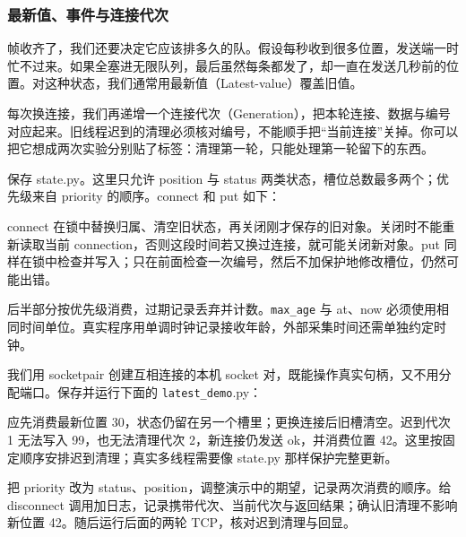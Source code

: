 \subsubsection{最新值、事件与连接代次}
帧收齐了，我们还要决定它应该排多久的队。假设每秒收到很多位置，发送端一时忙不过来。如果全塞进无限队列，最后虽然每条都发了，却一直在发送几秒前的位置。对这种状态，我们通常用最新值（Latest-value）覆盖旧值。

每次换连接，我们再递增一个连接代次（Generation），把本轮连接、数据与编号对应起来。旧线程迟到的清理必须核对编号，不能顺手把“当前连接”关掉。你可以把它想成两次实验分别贴了标签：清理第一轮，只能处理第一轮留下的东西。
\begin{example}[用完整状态类代替槽位伪代码]
保存 state.py。这里只允许 position 与 status 两类状态，槽位总数最多两个；优先级来自 priority 的顺序。connect 和 put 如下：
\begin{commcode}

\end{commcode}
connect 在锁中替换归属、清空旧状态，再关闭刚才保存的旧对象。关闭时不能重新读取当前 connection，否则这段时间若又换过连接，就可能关闭新对象。put 同样在锁中检查并写入；只在前面检查一次编号，然后不加保护地修改槽位，仍然可能出错。

后半部分按优先级消费，过期记录丢弃并计数。\texttt{max\_age} 与 at、now 必须使用相同时间单位。真实程序用单调时钟记录接收年龄，外部采集时间还需单独约定时钟。
\begin{commcode}

\end{commcode}
我们用 socketpair 创建互相连接的本机 socket 对，既能操作真实句柄，又不用分配端口。保存并运行下面的 \texttt{latest\_demo}.py：
\begin{commcode}

\end{commcode}
应先消费最新位置 30，状态仍留在另一个槽里；更换连接后旧槽清空。迟到代次 1 无法写入 99，也无法清理代次 2，新连接仍发送 ok，并消费位置 42。这里按固定顺序安排迟到清理；真实多线程需要像 state.py 那样保护完整更新。
\end{example}
\begin{exercise}\label{ex:v2-comm-latest}
把 priority 改为 status、position，调整演示中的期望，记录两次消费的顺序。给 disconnect 调用加日志，记录携带代次、当前代次与返回结果；确认旧清理不影响新位置 42。随后运行后面的两轮 TCP，核对迟到清理与回显。
\end{exercise}

